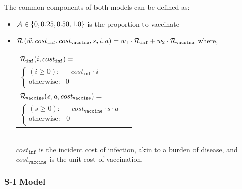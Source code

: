 The common components of both models can be defined as:
\begin{itemize}
    \item {\footnotesize $ \mathcal{A} \in \left\lbrace 0, 0.25, 0.50, 1.0 \right\rbrace $} is the proportion to vaccinate 
    \item {\footnotesize $ \mathcal{R}\left(\vec{w}, cost_{\mathtt{inf}}, cost_{\mathtt{vaccine}}, s, i, a \right) = w_1 \cdot \mathcal{R}_{\mathtt{inf}} + w_2 \cdot \mathcal{R}_{\mathtt{vaccine}}$} where, \\
    {\footnotesize 
        \abovedisplayskip=10pt
        \belowdisplayskip=0pt
        \renewcommand{\arraystretch}{1.5}
        \begin{tabular}{ll}    
            $ \mathcal{R}_{\mathtt{inf}}(i, cost_{\mathtt{inf}}) = $ &  $ $ \\
            \qquad $ \begin{cases}
            (i \geq 0) : & -cost_{\mathtt{inf}} \cdot i \\
            \text{otherwise} : & 0 \\
            \end{cases} $ & $ $ \\
            $ \mathcal{R}_{\mathtt{vaccine}}(s, a, cost_{\mathtt{vaccine}}) = $ &  $ $ \\
            \qquad $ \begin{cases}
            (s \geq 0) : & -cost_{\mathtt{vaccine}} \cdot s \cdot a \\
            \text{otherwise} : & 0 \\
            \end{cases} $ & $ $ \\
        \end{tabular}
    } \\
{\footnotesize $ cost_{\mathtt{inf}} $} is the incident cost of infection, akin to a burden of disease, and {\footnotesize $ cost_{\mathtt{vaccine}} $} is the unit cost of vaccination. \\    
\end{itemize}

\subsubsection{S-I Model}
\label{sec:results_influenza_sd}

